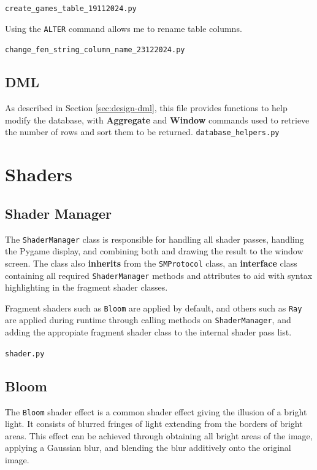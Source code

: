 \documentclass[../main/main.tex]{subfiles}
\begin{document}
\noindent\verb|create_games_table_19112024.py|

Using the \lstinline{ALTER} command allows me to rename table columns.

\bigskip
\noindent\verb|change_fen_string_column_name_23122024.py|


\subsection{DML}
\label{sec:dml}
As described in Section \ref{sec:design-dml}, this file provides functions to help modify the database, with \textbf{Aggregate} and \textbf{Window} commands used to retrieve the number of rows and sort them to be returned.
\noindent\verb|database_helpers.py|


\section{Shaders}
\subsection{Shader Manager}
The \lstinline{ShaderManager} class is responsible for handling all shader passes, handling the Pygame display, and combining both and drawing the result to the window screen. The class also \textbf{inherits} from the \lstinline{SMProtocol} class, an \textbf{interface} class containing all required \lstinline{ShaderManager} methods and attributes to aid with syntax highlighting in the fragment shader classes.

Fragment shaders such as \lstinline{Bloom} are applied by default, and others such as \lstinline{Ray} are applied during runtime through calling methods on \lstinline{ShaderManager}, and adding the appropiate fragment shader class to the internal shader pass list.

\noindent\verb|shader.py|


\subsection{Bloom}
\label{sec:shader-bloom}
The \lstinline{Bloom} shader effect is a common shader effect giving the illusion of a bright light. It consists of blurred fringes of light extending from the borders of bright areas. This effect can be achieved through obtaining all bright areas of the image, applying a Gaussian blur, and blending the blur additively onto the original image.
\end{document}

